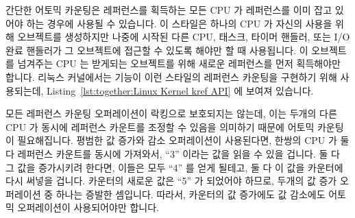 간단한 어토믹 카운팅은 레퍼런스를 획득하는 모든 CPU 가 레퍼런스를 이미 잡고
있어야 하는 경우에 사용될 수 있습니다.
이 스타일은 하나의 CPU 가 자신의 사용을 위해 오브젝트를 생성하지만 나중에
시작된 다른 CPU, 태스크, 타이머 핸들러, 또는 I/O 완료 핸들러가 그 오브젝트에
접근할 수 있도록 해야만 할 때 사용됩니다.
이 오브젝트를 넘겨주는 CPU 는 받게되는 오브젝트를 위해 새로운 레퍼런스를 먼저
획득해야만 합니다.
리눅스 커널에서는  기능이 이런 스타일의 레퍼런스 카운팅을 구현하기
위해 사용되는데,
Listing~\ref{lst:together:Linux Kernel kref API} 에 보여져 있습니다.
\iffalse

Simple atomic counting may be used in cases where any CPU acquiring
a reference must already hold a reference.
This style is used when a single CPU creates an object for its
own private use, but must allow other CPU, tasks, timer handlers,
or I/O completion handlers that it later spawns to also access this object.
Any CPU that hands the object off must first acquire a new reference
on behalf of the recipient object.
In the Linux kernel, the \co{kref} primitives are used to implement
this style of reference counting, as shown in
Listing~\ref{lst:together:Linux Kernel kref API}.
\fi

모든 레퍼런스 카운팅 오퍼레이션이 락킹으로 보호되지는 않는데, 이는 두개의 다른
CPU 가 동시에 레퍼런스 카운트를 조정할 수 있음을 의미하기 때문에 어토믹
카운팅이 필요해집니다.
평범한 값 증가와 감소 오퍼레이션이 사용된다면, 한쌍의 CPU 가 둘 다 레퍼런스
카운트를 동시에 가져와서, ``3'' 이라는 값을 읽을 수 있을 겁니다.
둘 다 그 값을 증가시키려 한다면, 이들은 모두 ``4'' 를 얻게 될테고, 둘 다 이
값을 카운터에 다시 써넣을 겁니다.
카운터의 새로운 값은 ``5'' 가 되었어야 하므로, 두개의 값 증가 오퍼레이션 중
하나는 증발한 셈입니다.
따라서, 카운터의 값 증가에도 값 감소에도 어토믹 오퍼레이션이 사용되어야만
합니다.
\iffalse

Atomic counting is required
because locking is not used to protect all reference-count operations,
which means that it is possible for two different CPUs to concurrently
manipulate the reference count.
If normal increment and decrement were used, a pair of CPUs might both
fetch the reference count concurrently, perhaps both obtaining
the value ``3''.
If both of them increment their value, they will both obtain ``4'',
and both will store this value back into the counter.
Since the new value of the counter should instead be ``5'', one
of the two increments has been lost.
Therefore, atomic operations must be used both for counter increments
and for counter decrements.
\fi

